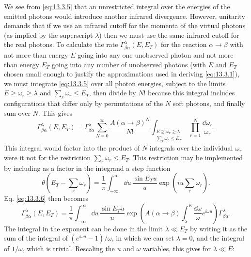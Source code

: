 We see from \eqref{eq:13.3.5} that an unrestricted integral over the energies
of the emitted photons would introduce another infrared divergence. However,
unitarity demands that if we use an infrared cutoff for the momenta of the
virtual photons (as implied by the superscript $\lambda$) then we must use the
same infrared cutoff for the real photons. To calculate the rate
$\Gamma^\lambda_{\beta\alpha}(E,E_T)$ for the reaction $\alpha\to\beta$ with
not more than energy $E$ going into any one unobserved photon and not more than
energy $E_T$ going into any number of unobserved photons (with $E$ and $E_T$
chosen small enough to justify the approximations used in deriving
\eqref{eq:13.3.1}), we must integrate \eqref{eq:13.3.5} over all photon
energies, subject to the limits $E\geq\omega_r\geq\lambda$ and
$\sum_r\omega_r\leq E_T$, then divide by $N!$ because this integral includes
configurations that differ only by permutations of the $N$ soft photons, and
finally sum over $N$. This gives
\begin{equation}
\Gamma^\lambda_{\beta\alpha}(E,E_T)
=\Gamma^\lambda_{\beta\alpha}\sum_{N=0}^{\infty}
\frac{A(\alpha\to\beta)^N}{N!}
\int_{\substack{E\geq\omega_r\geq\lambda\\
                 \sum_r\omega_r\leq E_T}}
\prod_{r=1}^{N}\frac{\dd\omega_r}{\omega_r}.
\tag{13.3.6}\label{eq:13.3.6}
\end{equation}
This integral would factor into the product of $N$ integrals over the
individual $\omega_r$ were it not for the restriction
$\sum_r\omega_r\leq E_T$. This restriction may be implemented by including as
a factor in the integrand a step function
\begin{equation}
\theta\left(E_T-\sum_r\omega_r\right)
=\frac{1}{\pi}\int_{-\infty}^{\infty}\dd u\,
\frac{\sin E_Tu}{u}\exp\left(iu\sum_r\omega_r\right).
\tag{13.3.7}\label{eq:13.3.7}
\end{equation}
Eq. \eqref{eq:13.3.6} then becomes
\begin{equation}
\Gamma^\lambda_{\beta\alpha}(E,E_T)
=\frac{1}{\pi}\int_{-\infty}^{\infty}\dd u\,
\frac{\sin E_Tu}{u}
\exp\left(A(\alpha\to\beta)\int_\lambda^E
\frac{\dd\omega}{\omega}e^{\ii\omega u}\right)
\Gamma^\lambda_{\beta\alpha}.
\tag{13.3.8}\label{eq:13.3.8}
\end{equation}
The integral in the exponent can be done in the limit $\lambda\ll E_T$ by
writing it as the sum of the integral of $(e^{\ii\omega u}-1)/\omega$, in which
we can set $\lambda=0$, and the integral of $1/\omega$, which is trivial.
Rescaling the $u$ and $\omega$ variables, this gives for $\lambda\ll E$:
